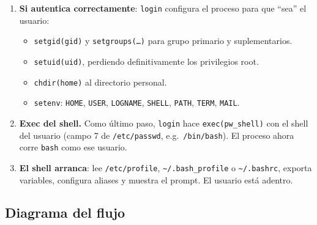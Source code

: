 \documentclass[11pt,a4paper]{article}
\begin{document}
\begin{enumerate}[leftmargin=*]
    \item \textbf{Si autentica correctamente}: \texttt{login}
        configura el proceso para que ``sea'' el usuario:
        \begin{itemize}[nosep]
            \item \texttt{setgid(gid)} y \texttt{setgroups(\ldots)} para
                grupo primario y suplementarios.
            \item \texttt{setuid(uid)}, perdiendo definitivamente los
                privilegios root.
            \item \texttt{chdir(home)} al directorio personal.
            \item \texttt{setenv}: \texttt{HOME}, \texttt{USER},
                \texttt{LOGNAME}, \texttt{SHELL}, \texttt{PATH},
                \texttt{TERM}, \texttt{MAIL}.
        \end{itemize}

    \item \textbf{Exec del shell.}
        Como último paso, \texttt{login} hace
        \texttt{exec(pw\_shell)} con el shell del usuario (campo 7
        de \texttt{/etc/passwd}, e.g.\ \texttt{/bin/bash}). El proceso
        ahora corre \texttt{bash} como ese usuario.

    \item \textbf{El shell arranca}: lee
        \texttt{/etc/profile}, \texttt{\textasciitilde/.bash\_profile}
        o \texttt{\textasciitilde/.bashrc}, exporta variables,
        configura aliases y muestra el prompt. El usuario está adentro.
\end{enumerate}

\subsection*{Diagrama del flujo}

\begin{center}
\end{center}
\end{document}
